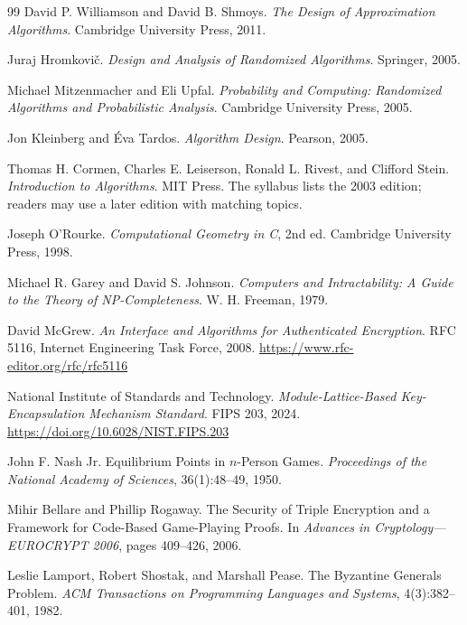 \documentclass[11pt,a4paper,oneside,openany]{book}
\begin{document}
\backmatter
{}
\begin{thebibliography}{99}
David P. Williamson and David B. Shmoys.
\newblock \emph{The Design of Approximation Algorithms}.
\newblock Cambridge University Press, 2011.

Juraj Hromkovič.
\newblock \emph{Design and Analysis of Randomized Algorithms}.
\newblock Springer, 2005.

Michael Mitzenmacher and Eli Upfal.
\newblock \emph{Probability and Computing: Randomized Algorithms and Probabilistic Analysis}.
\newblock Cambridge University Press, 2005.

Jon Kleinberg and Éva Tardos.
\newblock \emph{Algorithm Design}.
\newblock Pearson, 2005.

Thomas H. Cormen, Charles E. Leiserson, Ronald L. Rivest, and Clifford Stein.
\newblock \emph{Introduction to Algorithms}.
\newblock MIT Press. The syllabus lists the 2003 edition; readers may use a later edition with matching topics.

Joseph O'Rourke.
\newblock \emph{Computational Geometry in C}, 2nd ed.
\newblock Cambridge University Press, 1998.

Michael R. Garey and David S. Johnson.
\newblock \emph{Computers and Intractability: A Guide to the Theory of NP-Completeness}.
\newblock W. H. Freeman, 1979.

David McGrew.
\newblock \emph{An Interface and Algorithms for Authenticated Encryption}.
\newblock RFC 5116, Internet Engineering Task Force, 2008. \url{https://www.rfc-editor.org/rfc/rfc5116}

National Institute of Standards and Technology.
\newblock \emph{Module-Lattice-Based Key-Encapsulation Mechanism Standard}.
\newblock FIPS 203, 2024. \url{https://doi.org/10.6028/NIST.FIPS.203}

John F. Nash Jr.
\newblock Equilibrium Points in $n$-Person Games.
\newblock \emph{Proceedings of the National Academy of Sciences}, 36(1):48--49, 1950.

Mihir Bellare and Phillip Rogaway.
\newblock The Security of Triple Encryption and a Framework for Code-Based Game-Playing Proofs.
\newblock In \emph{Advances in Cryptology---EUROCRYPT 2006}, pages 409--426, 2006.

Leslie Lamport, Robert Shostak, and Marshall Pease.
\newblock The Byzantine Generals Problem.
\newblock \emph{ACM Transactions on Programming Languages and Systems}, 4(3):382--401, 1982.


\end{thebibliography}
\end{document}
